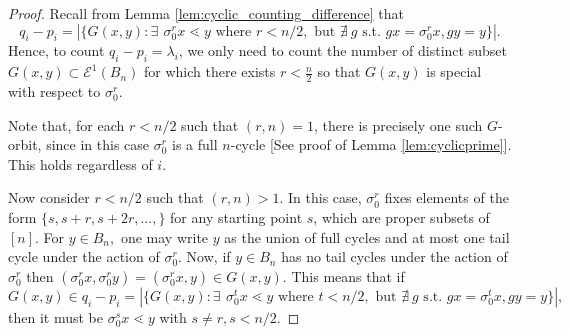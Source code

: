 \documentclass[10 pt]{amsart}
\theoremstyle{plain}
\theoremstyle{definition}
\theoremstyle{remark}
\numberwithin{equation}{section}
\begin{document}
\begin{proof} 

Recall from Lemma \ref{lem:cyclic_counting_difference} that 
 $$q_i - p_i =|\{G{(x , y)} : \exists \: \, \sigma_0^r x \lessdot y \text{ where } r < n/2, \text{ but } \nexists \:  g \text{ s.t. } g x = \sigma_0 ^r x, g y = y \}|.$$ 
Hence, to count $q_i - p_i = \lambda_i $, we only need to count the number of distinct subset $G(x, y) \subset \mathcal E^1(B_n)$ for which there exists $r < \frac n 2$ so that $G(x, y)$ is special with respect to $\sigma_0^r.$

Note that, for each $r < n/2$ such that $(r, n) = 1$, there is precisely one such $G$-orbit, since in this case $\sigma_0^r$ is a full $n$-cycle [See proof of Lemma \ref{lem:cyclicprime}]. 
This holds regardless of $i$. 

Now consider $r < n/2$ such that $(r, n) > 1$. In this case, $\sigma_0^r$ fixes elements of the form $\{s, s+r, s+2r, ..., \}$ for any starting point $s$, which are proper subsets of $[n]$. For $y \in B_n,$ one may write $y$ as the union of full cycles and at most one tail cycle under the action of $\sigma_0^r$. Now, if $y \in B_n$ has no tail cycles under the action of $\sigma_0^r$ then $(\sigma_0^rx , \sigma_0^ry)= (\sigma_0^rx , y) \in G(x, y).$ This means that if $G(x, y)\in q_i - p_i =|\{G{(x, y)} : \exists \: \, \sigma_0^t x \lessdot y \text{ where } t < n/2, \text{ but } \nexists \:  g \text{ s.t. } g x = \sigma_0 ^t x, g y = y \}|,$ then it must be $\sigma_0^s x \lessdot y$ with $s \neq r, s < n/2.$


\end{proof}
\end{document}
